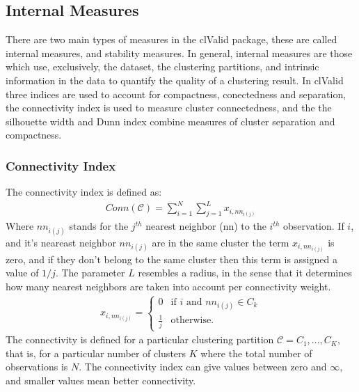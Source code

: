 \subsection{Internal Measures}
There are two main types of measures in the clValid package, these are
called internal measures, and stability measures. In general, internal
measures are those which use, exclusively, the dataset, the clustering
partitions,  and intrinsic  information in  the data  to  quantify the
quality of a  clustering result. In clValid three  indices are used to
account for compactness, conectedness and separation, the connectivity
index is used to measure cluster connectedness, and the the silhouette
width  and  Dunn index  combine  measures  of  cluster separation  and
compactness.

\subsubsection{Connectivity Index}
The connectivity index is defined as:
\begin{gather}
Conn(\mathcal{C}) = \sum_{i=1}^{N}\sum_{j=1}^{L} x_{i,nn_{i(j)}}
\end{gather}
Where $nn_{i(j)}$ stands for the $j^{th}$ nearest neighbor (nn) to the
$i^{th}$ observation.  If $i$,  and it's neareast neighbor $nn_{i(j)}$
are in  the same  cluster the term  $x_{i,nn_{i(j)}}$ is zero,  and if
they don't  belong to the  same cluster then  this term is  assigned a
value of $1/j$.  The parameter $L$ resembles a radius, in
the sense that it determines how many nearest neighbors are taken into
account per connectivity weight.
\begin{gather}
x_{i,nn_{i(j)}} =
    \begin{cases}
      0           &  \text{if } i \text{ and } nn_{i(j)} \in C_{k} \\
      \frac{1}{j} &  \text{otherwise.}
    \end{cases}
\end{gather}  
The  connectivity is  defined  for a  particular clustering  partition
$\mathcal{C} =  {C_{1},..., C_{K}}$, that is, for  a particular number
of clusters $K$ where the total number of observations is $N$. 
The connectivity index can give values between zero and $\infty$,
and smaller values mean better connectivity.

